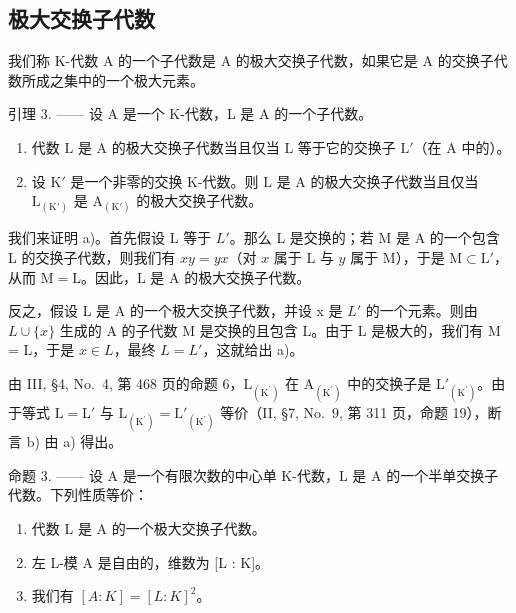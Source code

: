 \subsection{极大交换子代数}

我们称 K-代数 A 的一个子代数是 A 的极大交换子代数，如果它是 A 的交换子代数所成之集中的一个极大元素。

引理 3. —— 设 A 是一个 K-代数，L 是 A 的一个子代数。

\begin{enumerate}
\def\labelenumi{\alph{enumi})}
\item
  代数 \(\mathrm{L}\) 是 \(\mathrm{A}\) 的极大交换子代数当且仅当 \(\mathrm{L}\) 等于它的交换子 \(\mathrm{L}'\)（在 \(\mathrm{A}\) 中的）。
\item
  设 \(\mathrm{K}'\) 是一个非零的交换 K-代数。则 \(\mathrm{L}\) 是 A 的极大交换子代数当且仅当 \(\mathrm{L}_{(\mathrm{K}')}\) 是 \(\mathrm{A}_{(\mathrm{K}')}\) 的极大交换子代数。
\end{enumerate}

我们来证明 a)。首先假设 L 等于 \(L'\)。那么 L 是交换的；若 M 是 A 的一个包含 L 的交换子代数，则我们有 \(xy = yx\)（对 \(x\) 属于 \(\mathrm{L}\) 与 \(y\) 属于 \(\mathrm{M}\)），于是 \(\mathrm{M} \subset \mathrm{L}'\)，从而 \(\mathrm{M} = \mathrm{L}\)。因此，\(\mathrm{L}\) 是 \(\mathrm{A}\) 的极大交换子代数。

反之，假设 L 是 A 的一个极大交换子代数，并设 x 是 \(L'\) 的一个元素。则由 \(L \cup \{x\}\) 生成的 A 的子代数 M 是交换的且包含 L。由于 L 是极大的，我们有 M = L，于是 \(x \in L\)，最终 \(L = L'\)，这就给出 a)。

由 III, §4, No.~4, 第 468 页的命题 6，\(\mathrm{L}_{(\mathrm{K}^{\prime})}\) 在 \(\mathrm{A}_{(\mathrm{K}^{\prime})}\) 中的交换子是 \(\mathrm{L}'_{(\mathrm{K}^{\prime})}\)。由于等式 \(\mathrm{L} = \mathrm{L}'\) 与 \(\mathrm{L}_{(\mathrm{K}^{\prime})} = \mathrm{L}'_{(\mathrm{K}^{\prime})}\) 等价（II, §7, No.~9, 第 311 页，命题 19），断言 b) 由 a) 得出。

命题 3. —— 设 A 是一个有限次数的中心单 K-代数，L 是 A 的一个半单交换子代数。下列性质等价：

\begin{enumerate}
\def\labelenumi{(\roman{enumi})}
\item
  代数 \(\mathrm{L}\) 是 \(\mathrm{A}\) 的一个极大交换子代数。
\item
  左 L-模 A 是自由的，维数为 {[}L : K{]}。
\item
  我们有 \([A:K]=[L:K]^{2}\)。
\end{enumerate}

